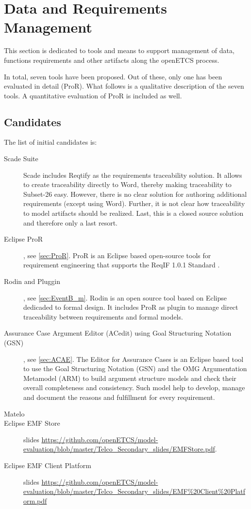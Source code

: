 

\chapter{Data and Requirements Management}
\label{sec:management}

 
This section is dedicated to tools and means to support management of data, functions requirements and other artifacts along  the openETCS process.

In total, seven tools have been proposed.  Out of these, only one has been evaluated in detail (ProR).  What follows is a qualitative description of the seven tools.  A quantitative evaluation of ProR is included as well.

\section{Candidates}
The list of initial candidates is:

\begin{description}
\item[Scade Suite]  Scade includes Reqtify as the requirements traceability solution.  It allows to create traceability directly to Word, thereby making traceability to Subset-26 easy.  However, there is no clear solution for authoring additional requirements (except using Word).  Further, it is not clear how traceability to model artifacts should be realized.  Last, this is a closed source solution and therefore only a last resort.
\item[Eclipse ProR], see \ref{sec:ProR}. ProR is an Eclipse based open-source tools for requirement engineering that supports the ReqIF 1.0.1 Standard .
\item[Rodin and Pluggin], see \ref{sec:EventB_m}. Rodin is an open source tool based on Eclipse dedicaded to formal  design. It includes ProR as plugin to  manage direct traceability between requirements and formal models.
\item[Assurance Case Argument Editor (ACedit) using Goal Structuring Notation (GSN)], see \ref{sec:ACAE}. The Editor for Assurance Cases is an Eclipse based tool to use the Goal Structuring Notation (GSN) and the OMG Argumentation Metamodel (ARM) to build argument structure models and check their overall completeness and consistency. Such model help to develop, manage and document the reasons and fulfillment for every requirement.
\item[Matelo]
\item[Eclipse EMF Store] slides \url{https://github.com/openETCS/model-evaluation/blob/master/Telco_Secondary_slides/EMFStore.pdf}.
\item[Eclipse EMF Client Platform] slides \url{https://github.com/openETCS/model-evaluation/blob/master/Telco_Secondary_slides/EMF%20Client%20Platform.pdf}
\end{description}


